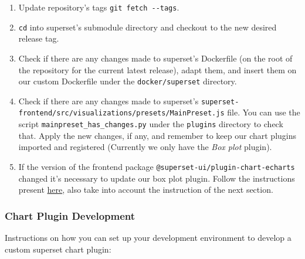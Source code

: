 \documentclass[
]{book}
\begin{document}
\begin{enumerate}
\def\labelenumi{\arabic{enumi}.}
\item
  Update repository's tags \texttt{git\ fetch\ -\/-tags}.
\item
  \texttt{cd} into superset's submodule directory and checkout to the new desired release tag.
\item
  Check if there are any changes made to superset's Dockerfile (on the root of the repository for the current latest release), adapt them, and insert them on our custom Dockerfile under the \texttt{docker/superset} directory.
\item
  Check if there are any changes made to superset's \texttt{superset-frontend/src/visualizations/presets/MainPreset.js} file.
  You can use the script \texttt{mainpreset\_has\_changes.py} under the \texttt{plugins} directory to check that.
  Apply the new changes, if any, and remember to keep our chart plugins imported and registered (Currently we only have the \emph{Box plot} plugin).
\item
  If the version of the frontend package \texttt{@superset-ui/plugin-chart-echarts} changed it's necessary to update our box plot plugin.
  Follow the instructions present \href{https://github.com/EHDEN/NetworkDashboards/tree/master/superset/plugins/plugins/plugin-chart-box-plot\#how-to-update}{here}, also take into account the instruction of the next section.
\end{enumerate}

\hypertarget{chart-plugin-development}{%
\subsubsection*{Chart Plugin Development}\label{chart-plugin-development}}

Instructions on how you can set up your development environment to develop a custom superset chart plugin:
\end{document}
